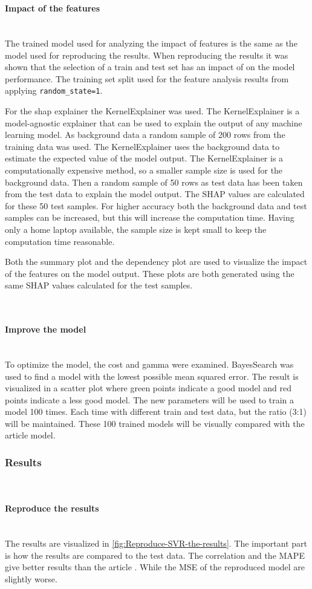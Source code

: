 \documentclass{article}
\newcommand{\subsubsubsection}[1]{%
  \paragraph{#1}\mbox{}\\}
\begin{document}
\subsubsubsection{Impact of the features}
The trained model used for analyzing the impact of features is the same as the model used for reproducing the results.
When reproducing the results it was shown that the selection of a train and test set has an impact of on the model performance.
The training set split used for the feature analysis results from applying {\texttt{random\_state=1}}.

For the shap explainer the KernelExplainer was used.
The KernelExplainer is a model-agnostic explainer that can be used to explain the output of any machine learning model.
As background data a random sample of 200 rows from the training data was used.
The KernelExplainer uses the background data to estimate the expected value of the model output.
The KernelExplainer is a computationally expensive method, so a smaller sample size is used for the background data.
Then a random sample of 50 rows as test data has been taken from the test data to explain the model output.
The SHAP values are calculated for these 50 test samples.
For higher accuracy both the background data and test samples can be increased, but this will increase the computation time.
Having only a home laptop available, the sample size is kept small to keep the computation time reasonable.

Both the summary plot and the dependency plot are used to visualize the impact of the features on the model output.
These plots are both generated using the same SHAP values calculated for the test samples.

\subsubsubsection{Improve the model}
To optimize the model, the cost and gamma were examined. BayesSearch was used to find a model with the lowest possible mean squared error. The result is visualized in a scatter plot where green points indicate a good model and red points indicate a less good model.
The new parameters will be used to train a model 100 times. Each time with different train and test data, but the ratio (3:1) will be maintained. These 100 trained models will be visually compared with the article \cite{dahal2021prediction} model.

\subsubsection{Results}

\subsubsubsection{Reproduce the results}

The results are visualized in \autoref{fig:Reproduce-SVR-the-results}. The important part is how the results are compared to the test data. The correlation and the MAPE give better results than the article \cite{dahal2021prediction}. While the MSE of the reproduced model are slightly worse.
\end{document}
